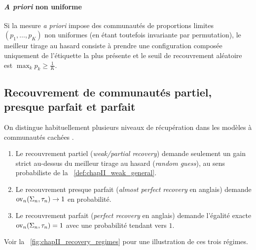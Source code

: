 
\paragraph{\emph{A priori} non uniforme}
Si la mesure \emph{a priori} impose des communautés de proportions limites $(p_1,\ldots,p_K)$ non uniformes (en étant toutefois invariante par permutation), le meilleur tirage au hasard consiste à prendre une configuration composée uniquement de l'étiquette la plus présente et le seuil de recouvrement aléatoire est $\max_{k} p_k \ge \frac1K$.

\subsection{Recouvrement de communautés partiel, presque parfait et parfait}

On distingue habituellement plusieurs niveaux de récupération dans les modèles à communautés cachées \cite{Abbe2017,SankararamanBaccelli2018}.
\begin{enumerate}
    \item Le recouvrement partiel (\emph{weak/partial recovery}) demande seulement un gain strict au-dessus du meilleur tirage au hasard (\emph{random guess}), au sens probabiliste de la \Def~\ref{def:chapII_weak_general}.
    \item Le recouvrement presque parfait (\emph{almost perfect recovery} en anglais) demande $\operatorname{ov}_n(\Sigma_n,\tau_n)\to1$ en probabilité.
    \item Le recouvrement parfait (\emph{perfect recovery} en anglais) demande l'égalité exacte $\operatorname{ov}_n(\Sigma_n,\tau_n) = 1$ avec une probabilité tendant vers $1$.
\end{enumerate}
Voir la \Fig~\ref{fig:chapII_recovery_regimes} pour une illustration de ces trois régimes.


